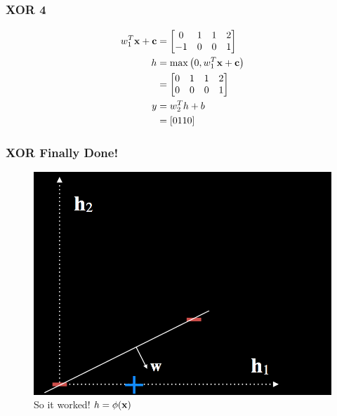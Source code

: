 \documentclass[10pt]{beamer}
\begin{document}
\begin{frame}
	\frametitle{XOR 4}
	\begin{align}
		w_1^T \vb{x} + \vb{c} &= \qty[\begin{matrix}0&1&1&2\\-1&0&0&1\end{matrix}] \\
		h &= \max \qty(0, w_1^T \vb{x} + \vb{c}) \\
		&= \qty[\begin{matrix}0&1&1&2\\0&0&0&1\end{matrix}] \\
		y &= w_2^T h + b \\
		&= \qty[0 1 1 0]
	\end{align}
\end{frame}

\begin{frame}
	\frametitle{XOR Finally Done!}
	\begin{figure}
		\includegraphics[width=\textwidth,height=0.75\textheight,keepaspectratio=true]{xor_mapped.png}
		\caption{So it worked! $h = \phi(\vb{x})$}
	\end{figure}
\end{frame}
\end{document}
